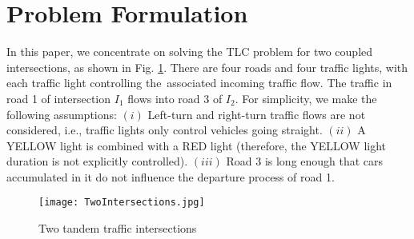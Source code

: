 \documentclass{ifacconf}\usepackage{graphicx}
\begin{document}
\section{Problem Formulation}

In this paper, we concentrate on solving the TLC problem for two coupled
intersections, as shown in Fig. \ref{junction}. There are four roads and four
traffic lights, with each traffic light controlling the\ associated incoming
traffic flow. The traffic in road 1 of intersection $I_{1}$ flows into road 3
of $I_{2}$. For simplicity, we make the following assumptions: $(i)$ Left-turn
and right-turn traffic flows are not considered, i.e., traffic lights only
control vehicles going straight. $(ii)$ A YELLOW light is combined with a RED
light (therefore, the YELLOW light duration is not explicitly controlled).
$(iii)$ Road 3 is long enough that cars accumulated in it do not influence the
departure process of road 1.

\begin{figure}[tbh]
\centering
\texttt{[image: TwoIntersections.jpg]} \caption{Two tandem
traffic intersections}\label{junction}\end{figure}
\end{document}
